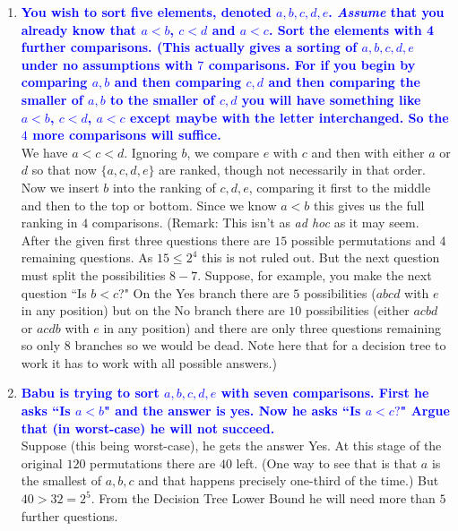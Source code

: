 \documentclass[11pt]{article}
\begin{document}
\begin{enumerate}
\item \textbf{\textcolor{blue}{You wish to sort five elements, denoted $a,b,c,d,e$. 
{\em Assume} that you already know that $a<b$, $c<d$ and $a<c$. 
Sort the elements with 4 further comparisons. (This actually gives a sorting of $a,b,c,d,e$ under no 
assumptions with $7$ comparisons. For if you begin by comparing $a,b$ and then comparing $c,d$ and 
then comparing the smaller of $a,b$ to the smaller of $c,d$ you will have something like $a<b$, $c<d$, $a<c$ 
except maybe with the letter interchanged. So the $4$ more comparisons will suffice.}}
    \\ We have $a<c<d$.  Ignoring $b$, we compare $e$
    with $c$ and then with either $a$ or $d$ so that now $\{a,c,d,e\}$ are
    ranked, though not necessarily in that order.  Now we insert $b$ into
    the ranking of $c,d,e$, comparing it first to the middle and then to the
    top or bottom.  Since we know $a<b$ this gives us the full ranking in
    $4$ comparisons. (Remark: This isn't as {\em ad hoc} as it may seem.
    After the given first three questions there are $15$ possible permutations
    and $4$ remaining questions.  As $15\leq 2^4$ this is not ruled out.
    But the next question must split the possibilities $8-7$.  Suppose,
    for example, you make the next question ``Is $b<c$?" On the Yes
    branch there are $5$ possibilities ($abcd$ with $e$ in any position)
    but on the No branch there are $10$ possibilities (either $acbd$  
    or $acdb$ with $e$ in any position) and there are only three
    questions remaining so only $8$ branches so we would be dead.
    Note here that for a decision tree to work it has to work with
    all possible answers.)

\item \textbf{\textcolor{blue}{Babu is trying to sort $a,b,c,d,e$ with seven comparisons.  First
he asks ``Is $a  < b$" and the answer is yes.  Now he asks ``Is $a < c?$"
Argue that (in worst-case) he will not succeed.}}
    \\ Suppose (this being worst-case), he gets the answer Yes.  At this
    stage of the original $120$ permutations there are $40$ left.  (One
    way to see that is that $a$ is the smallest of $a,b,c$ and that happens
    precisely one-third of the time.)  But $40 > 32 = 2^5$.  From the
    Decision Tree Lower Bound he will need more than $5$ further questions.


\end{enumerate}
\end{document}
